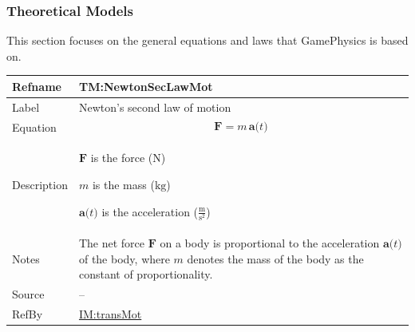 \documentclass[12pt]{article}
\begin{document}
\subsubsection{Theoretical Models}
\label{Sec:TMs}
This section focuses on the general equations and laws that GamePhysics is based on.

\medskip
\noindent
\begin{minipage}{\textwidth}
\begin{tabular}{>{\raggedright}p{}>{\raggedright\arraybackslash}p{}}
\toprule \textbf{Refname} & \textbf{TM:NewtonSecLawMot}
\label{TM:NewtonSecLawMot}
\\ \midrule
Label & Newton's second law of motion
        
\\ \midrule
Equation & \begin{displaymath}
           \symbf{F}=m\,\symbf{a}\text{(}t\text{)}
           \end{displaymath}
\\ \midrule
Description & \begin{symbDescription}
              \item{$\symbf{F}$ is the force (${\text{N}}$)}
              \item{$m$ is the mass (${\text{kg}}$)}
              \item{$\symbf{a}\text{(}t\text{)}$ is the acceleration ($\frac{\text{m}}{\text{s}^{2}}$)}
              \end{symbDescription}
\\ \midrule
Notes & The net force $\symbf{F}$ on a body is proportional to the acceleration $\symbf{a}\text{(}t\text{)}$ of the body, where $m$ denotes the mass of the body as the constant of proportionality.
        
\\ \midrule
Source & --
         
\\ \midrule
RefBy & \hyperref[IM:transMot]{IM:transMot}
        
\\ \bottomrule
\end{tabular}
\end{minipage}
\end{document}
